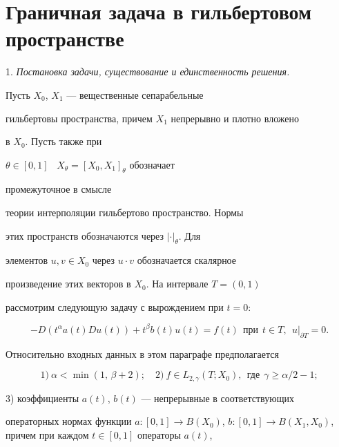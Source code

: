 \section{Граничная задача в гильбертовом пространстве}


\label{BoundProblem}





1. {\it Постановка задачи, существование и единственность решения.}


Пусть $X_0$, $X_1$ --- вещественные сепарабельные


гильбертовы пространства, причем $X_1$ непрерывно и плотно вложено


в $X_0$. Пусть также при


$\theta \in [0,1]$ \ $X_\theta=[X_0,X_1]_\theta$ обозначает 


промежуточное в смысле


теории интерполяции \cite{Tribel} гильбертово пространство. Нормы


этих пространств обозначаются через $|\cdot|_\theta$. Для


элементов $u,v \in X_0$ через $u\cdot v$ обозначается скалярное


произведение этих векторов в $X_0$. На интервале $T=(0,1)$


рассмотрим следующую задачу с вырождением при $t=0$:


\begin{equation}\label{eq-H}


-D(t^\alpha a(t)D u(t)) +t^\beta b(t) u(t) = f(t)


\ \ \text{при} \ \ t \in T, \ \ u|_{\partial T}=0.


\end{equation}


Относительно входных данных в этом параграфе предполагается


\begin{equation}\label{cond}


1)\ \alpha <\min(1,\,\beta+2); \quad


2)\ f \in L_{2,\gamma}(T;X_0), \ \ \text{где} \ \ \gamma \ge\alpha/2-1;


\end{equation}


3) коэффициенты $a(t)$, $b(t)$ --- непрерывные в соответствующих


операторных нормах функции $a:[0,1] \to B(X_0)$, $b:[0,1] \to


B(X_1,X_0)$, причем при каждом $t \in [0,1]$ операторы $a(t)$,


